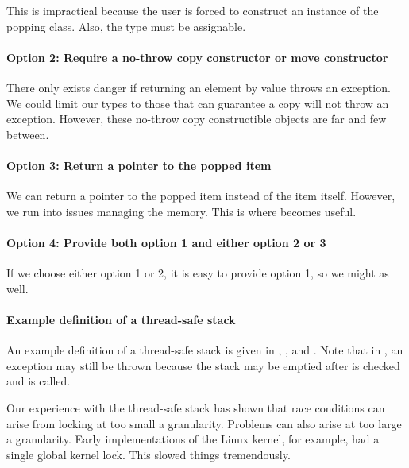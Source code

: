 This is impractical because the user is forced to construct an instance of the popping class. Also, the type must be assignable.

\paragraph{Option 2: Require a no-throw copy constructor or move constructor}
There only exists danger if returning an element by value throws an exception. We could limit our types to those that can guarantee a copy will not throw an exception. However, these no-throw copy constructible objects are far and few between.

\paragraph{Option 3: Return a pointer to the popped item}
We can return a pointer to the popped item instead of the item itself. However, we run into issues managing the memory. This is where  becomes useful. 

\paragraph{Option 4: Provide both option 1 and either option 2 or 3}
If we choose either option 1 or 2, it is easy to provide option 1, so we might as well.

\paragraph{Example definition of a thread-safe stack}
An example definition of a thread-safe stack is given in , , and . Note that in , an exception may still be thrown because the stack may be emptied after  is checked and  is called.


Our experience with the thread-safe stack has shown that race conditions can arise from locking at too small a granularity. Problems can also arise at too large a granularity. Early implementations of the Linux kernel, for example, had a single global kernel lock. This slowed things tremendously. 


